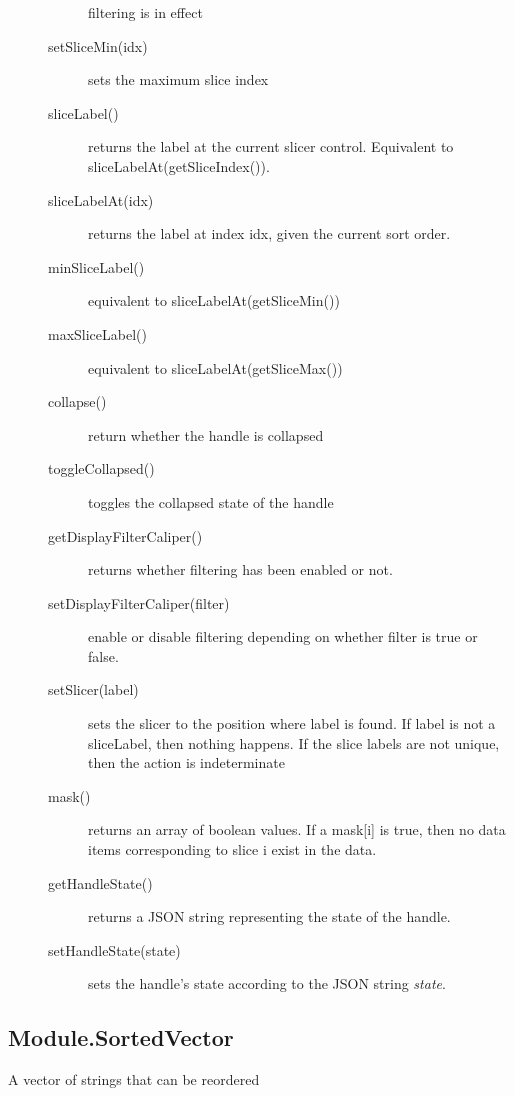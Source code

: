 \documentclass{article}
\begin{document}
\begin{description}
\begin{description}
  filtering is in effect
\item[setSliceMin(idx)] sets the maximum slice index
\item[sliceLabel()] returns the label at the current slicer
  control. Equivalent to sliceLabelAt(getSliceIndex()).
\item[sliceLabelAt(idx)] returns the label at index idx, given the
  current sort order.
\item[minSliceLabel()] equivalent to sliceLabelAt(getSliceMin())
\item[maxSliceLabel()] equivalent to sliceLabelAt(getSliceMax())
\item[collapse()] return whether the handle is collapsed
\item[toggleCollapsed()] toggles the collapsed state of the handle
\item[getDisplayFilterCaliper()] returns whether filtering has been
  enabled or not.
\item[setDisplayFilterCaliper(filter)] enable or disable filtering
  depending on whether filter is true or false.
\item[setSlicer(label)] sets the slicer to the position where label is
  found. If label is not a sliceLabel, then nothing happens. If the
  slice labels are not unique, then the action is indeterminate
\item[mask()] returns an array of boolean values. If a mask[i] is
  true, then no data items corresponding to slice i exist in the
  data.
\item[getHandleState()] returns a JSON string representing the state
  of the handle.
\item[setHandleState(state)] sets the handle's state according to the
  JSON string {\em state}.
\end{description}
\end{description}

\subsection{Module.SortedVector}

A vector of strings that can be reordered
\end{document}

